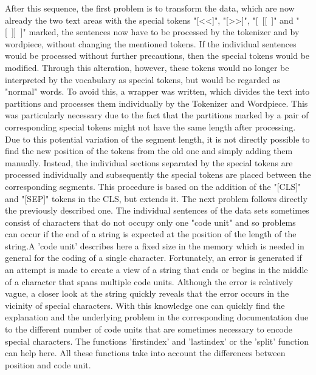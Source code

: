 After this sequence, the first problem is to transform the data, which are now already the two text areas with the special tokens "[\textless\textless]", "[\textgreater\textgreater]", "[~[[~]" and "[~]]~]" marked, the sentences now have to be processed by the tokenizer and by wordpiece, without changing the mentioned tokens. If the individual sentences would be processed without further precautions, then the special tokens would be modified. Through this alteration, however, these tokens would no longer be interpreted by the vocabulary as special tokens, but would be regarded as "normal" words. To avoid this, a wrapper was written, which divides the text into partitions and processes them individually by the Tokenizer and Wordpiece. This was particularly necessary due to the fact that the partitions marked by a pair of corresponding special tokens might not have the same length after processing. Due to this potential variation of the segment length, it is not directly possible to find the new position of the tokens from the old one and simply adding them manually. Instead, the individual sections separated by the special tokens are processed individually and subsequently the special tokens are placed between the corresponding segments. This procedure is based on the addition of the "[CLS]" and "[SEP]" tokens in the CLS, but extends it.
The next problem follows directly the previously described one. The individual sentences of the data sets sometimes consist of characters that do not occupy only one "code unit" and so problems can occur if the end of a string is expected at the position of the length of the string.A 'code unit' describes here a fixed size in the memory which is needed in general for the coding of a single character. Fortunately, an error is generated if an attempt is made to create a view of a string that ends or begins in the middle of a character that spans multiple code units. Although the error is relatively vague, a closer look at the string quickly reveals that the error occurs in the vicinity of special characters. With this knowledge one can quickly find the explanation and the underlying problem in the corresponding documentation due to the different number of code units that are sometimes necessary to encode special characters. The functions 'firstindex' and 'lastindex' or the 'split' function can help here. All these functions take into account the differences between position and code unit.

